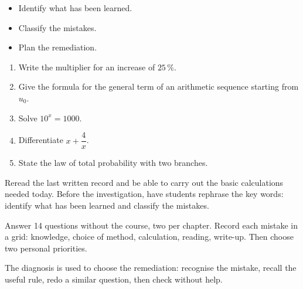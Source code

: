 \begin{objectifs}\begin{itemize}\item Identify what has been learned.\item Classify the mistakes.\item Plan the remediation.\end{itemize}\end{objectifs}
\begin{automatismes}\begin{enumerate}\item Write the multiplier for an increase of $25\,\%$. \item Give the formula for the general term of an arithmetic sequence starting from $u_0$. \item Solve $10^x=1000$. \item Differentiate $x+\dfrac4x$. \item State the law of total probability with two branches. \end{enumerate}\end{automatismes}
\begin{prerequis}Reread the last written record and be able to carry out the basic calculations needed today. Before the investigation, have students rephrase the key words: identify what has been learned and classify the mistakes.\end{prerequis}

\begin{activite}
Answer 14 questions without the course, two per chapter. Record each mistake in a grid: knowledge, choice of method, calculation, reading, write-up. Then choose two personal priorities.

\end{activite}

\begin{traceecrite}The diagnosis is used to choose the remediation: recognise the mistake, recall the useful rule, redo a similar question, then check without help.\end{traceecrite}

